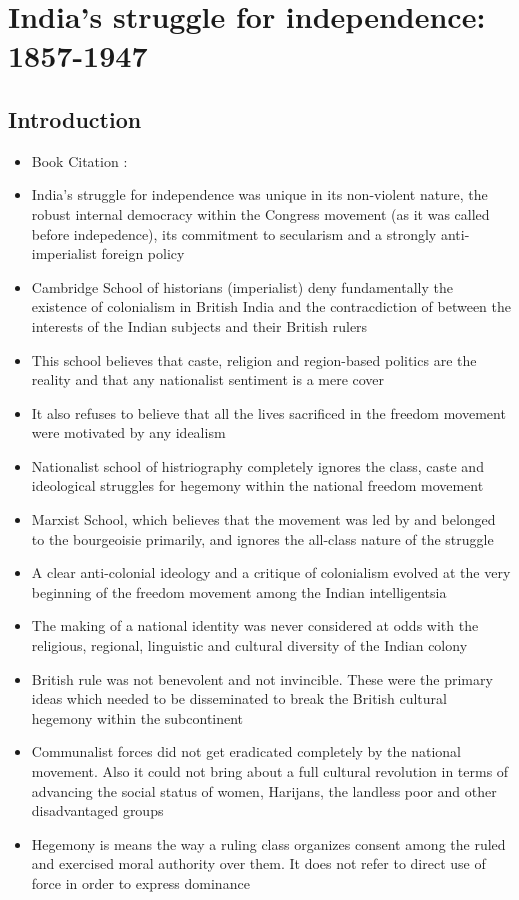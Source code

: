 \chapter{India's struggle for independence: 1857-1947}

\section*{Introduction}
\begin{itemize}
    \item Book Citation : \cite{Bipan__2016}
    \item India's struggle for independence was unique in its non-violent nature, the robust internal democracy within the Congress movement (as it was called before indepedence), its commitment to secularism and a strongly anti-imperialist foreign policy
    \item Cambridge School of historians (imperialist) deny fundamentally the existence of colonialism in British India and the contracdiction of between the interests of the Indian subjects and their British rulers
    \item This school believes that caste, religion and region-based politics are the reality and that any nationalist sentiment is a mere cover
    \item It also refuses to believe that all the lives sacrificed in the freedom movement were motivated by any idealism
    \item Nationalist school of histriography completely ignores the class, caste and ideological struggles for hegemony within the national freedom movement
    \item Marxist School, which believes that the movement was led by and belonged to the bourgeoisie primarily, and ignores the all-class nature of the struggle
    \item A clear anti-colonial ideology and a critique of colonialism evolved at the very beginning of the freedom movement among the Indian intelligentsia
    \item The making of a national identity was never considered at odds with the religious, regional, linguistic and cultural diversity of the Indian colony
    \item British rule was not benevolent and not invincible. These were the primary ideas which needed to be disseminated to break the British cultural hegemony within the subcontinent
    \item Communalist forces did not get eradicated completely by the national movement. Also it could not bring about a full cultural revolution in terms of advancing the social status of women, Harijans, the landless poor and other disadvantaged groups
    \item Hegemony is means the way a ruling class organizes consent among the ruled and exercised moral authority over them. It does not refer to direct use of force in order to express dominance
\end{itemize}

